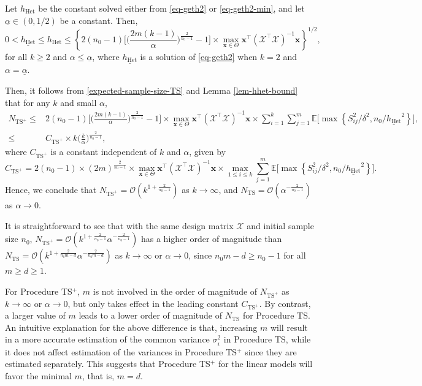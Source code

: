 \documentclass[ijoc,nonblindrev]{informs3}
\def\E{\mathbb{E}}
\def\bx{{\bm x}}
\def\cX{{\mathcal X}}
\def\hhet{h_{\mathrm{Het}}}
\begin{document}
\begin{lemma}  \label{lem-hhet-bound}
Let $\hhet$ be the constant solved either from \eqref{eq-geth2} or \eqref{eq-geth2-min}, and let $\underline{\alpha}\in(0,1/2)$ be a constant.
Then,
$$0 < \underline{\hhet} \leq \hhet \leq \left\{2(n_0-1)\Big[\Big(\frac{2m(k-1)}{\alpha}\Big)^{\frac{2}{n_0-1}}-1\Big] \times \max_{\bx\in\Theta} \bx^\intercal (\cX^\intercal \cX)^{-1} \bx \right\}^{1/2},$$
for all $k\geq 2$ and $\alpha\leq \underline{\alpha}$,
where $\underline{\hhet}$ is a solution of \eqref{eq-geth2} when $k=2$ and $\alpha=\underline{\alpha}$.
\end{lemma}

Then, it follows from \eqref{expected-sample-size-TS} and Lemma \ref{lem-hhet-bound} that
for any $k$ and small $\alpha$,
\begin{align*}
N_{\text{TS}^+}  \leq{}& 2(n_0-1)\Big[\Big(\frac{2m(k-1)}{\alpha}\Big)^{\frac{2}{n_0-1}}-1\Big] \times \max_{\bx\in\Theta} \bx^\intercal (\cX^\intercal \cX)^{-1} \bx \times \sum_{i=1}^k \sum_{j=1}^m \E \big[ \max \left\{ S_{ij}^2/\delta^2, n_0/\underline{\hhet}^2 \right\} \big], \\
\leq{}& C_{\text{TS}^+} \times k\Big(\frac{k}{\alpha}\Big)^{\frac{2}{n_0-1}},
\end{align*}
where $C_{\text{TS}^+}$ is a constant independent of $k$ and $\alpha$, given by
\[
C_{\text{TS}^+} = 2(n_0-1)\times (2m)^{\frac{2}{n_0-1}} \times \max_{\bx\in\Theta} \bx^\intercal (\cX^\intercal \cX)^{-1} \bx \times\max_{1\leq i\leq k} \sum_{j=1}^m \E \big[ \max \left\{ S_{ij}^2/\delta^2, n_0/\underline{\hhet}^2 \right\} \big].
\]
Hence, we conclude that $N_{\text{TS}^+} = \mathcal{O}(k^{1+\frac{2}{n_0-1}})$ as $k\to\infty$, and $N_{\text{TS}} = \mathcal{O}(\alpha^{-\frac{2}{n_0-1}})$ as $\alpha\to 0$.

\begin{remark}
It is straightforward to see that with the same design matrix $\cX$ and  initial sample size $n_0$,
$N_{\text{TS}^+}=\mathcal{O}(k^{1+\frac{2}{n_0-1}}\alpha^{-\frac{2}{n_0-1}})$ has a higher order of magnitude than $N_{\text{TS}}=\mathcal{O}(k^{1+\frac{2}{n_0m-d}}\alpha^{-\frac{2}{n_0m-d}})$ as $k\to\infty$ or $\alpha\to 0$, since $n_0m-d\geq n_0-1$ for all $m\geq d \geq 1$.
\end{remark}


\begin{remark}
For Procedure TS$^+$, $m$ is not involved in the order of magnitude of $N_{\text{TS}^+}$ as $k\to\infty$ or $\alpha\to 0$, but only takes effect in the leading constant $C_{\text{TS}^+}$.
By contrast,
a larger value of $m$ leads to a lower order of magnitude of $N_{\text{TS}}$ for Procedure TS.
An intuitive explanation for the above difference is that, increasing $m$ will result in a more accurate estimation of the common variance $\sigma_i^2$ in Procedure TS, while it does not affect estimation of the variances in Procedure TS$^+$ since they are estimated separately.
This suggests that Procedure TS$^+$ for the linear models will favor the minimal $m$, that is, $m=d$.
\end{remark}
\end{document}
